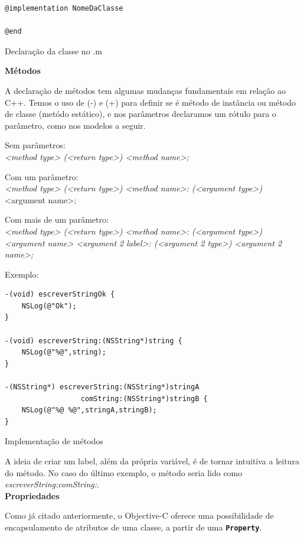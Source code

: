 \documentclass[a4paper,12pt,brazil,oneside]{book}
\begin{document}
\begin{listing}
\begin{verbatim}
@implementation NomeDaClasse

@end
\end{verbatim}
\caption{Declaração da classe no .m}
\end{listing}


\textbf{Métodos}


A declaração de métodos tem algumas mudanças fundamentais em relação ao C++. Temos o uso de (-) e (+) para definir se é método de instância ou método de classe (metódo estático), e nos parâmetros declaramos um rótulo para o parâmetro, como nos modelos a seguir.


Sem parâmetros:\\
\emph{<method type> (<return type>) <method name>;}


Com um parâmetro:\\
\emph{<method type> (<return type>) <method name>: (<argument type>)} <argument name>;


Com mais de um parâmetro:\\
\emph{<method type> (<return type>) <method name>: (<argument type>) <argument name> <argument 2 label>: (<argument 2 type>) <argument 2 name>;}


Exemplo:

\begin{listing}
\begin{verbatim}
-(void) escreverStringOk {
	NSLog(@"Ok");
}

-(void) escreverString:(NSString*)string {
	NSLog(@"%@",string);
}

-(NSString*) escreverString:(NSString*)stringA
                  comString:(NSString*)stringB {
	NSLog(@"%@ %@",stringA,stringB);
}
\end{verbatim}
\caption{Implementação de métodos}
\end{listing}


A ideia de criar um label, além da própria variável, é de tornar intuitiva a leitura do método. No caso do último exemplo, o método seria lido como \emph{escreverString:comString:}.\\


\textbf{Propriedades}


Como já citado anteriormente, o Objective-C oferece uma possibilidade de encapsulamento de atributos de uma classe, a partir de uma \texttt{\textbf{Property}}.
\end{document}
